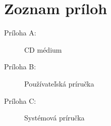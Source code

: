 \section*{Zoznam pr\'iloh}
\thispagestyle{empty}

\begin{description}
	\item[Príloha A:] CD médium
	\item[Príloha B:] Používateľská príručka
	\item[Príloha C:] Systémová príručka

\end{description}